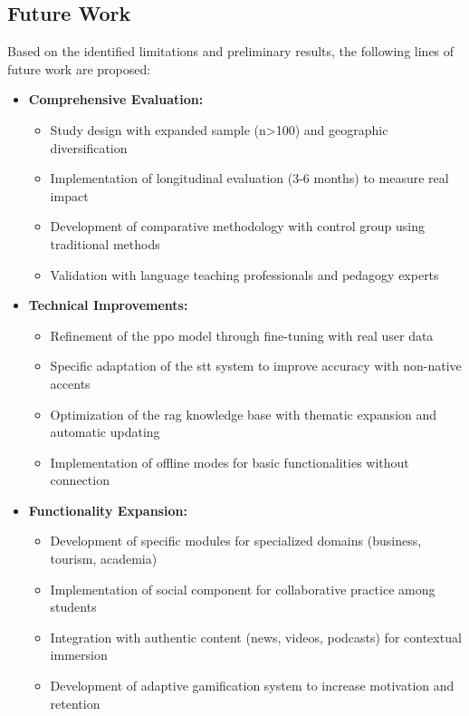 \subsection{Future Work}

Based on the identified limitations and preliminary results, the following lines of future work are proposed:

\begin{itemize}
    \item \textbf{Comprehensive Evaluation:}
    \begin{itemize}
        \item Study design with expanded sample (n>100) and geographic diversification
        \item Implementation of longitudinal evaluation (3-6 months) to measure real impact
        \item Development of comparative methodology with control group using traditional methods
        \item Validation with language teaching professionals and pedagogy experts
    \end{itemize}

    \item \textbf{Technical Improvements:}
    \begin{itemize}
        \item Refinement of the \gls{ppo} model through fine-tuning with real user data
        \item Specific adaptation of the \gls{stt} system to improve accuracy with non-native accents
        \item Optimization of the \gls{rag} knowledge base with thematic expansion and automatic updating
        \item Implementation of offline modes for basic functionalities without connection
    \end{itemize}

    \item \textbf{Functionality Expansion:}
    \begin{itemize}
        \item Development of specific modules for specialized domains (business, tourism, academia)
        \item Implementation of social component for collaborative practice among students
        \item Integration with authentic content (news, videos, podcasts) for contextual immersion
        \item Development of adaptive gamification system to increase motivation and retention
    \end{itemize}
\end{itemize}

